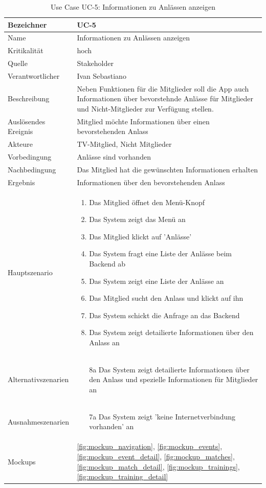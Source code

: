 \begin{table}[ht]
\centering
  \begin{tabular}{ l | p{10cm} }
	\hline
	\rowcolor{gray}
	Bezeichner		&	UC-5\\ \hline
	Name			&	Informationen zu Anlässen anzeigen\\ \hline
	Kritikalität		&	hoch\\ \hline
	Quelle			&	Stakeholder\\ \hline
	Verantwortlicher	&	Ivan Sebastiano\\ \hline
	Beschreibung	&	Neben Funktionen für die Mitglieder soll die App auch Informationen über bevorstehnde Anlässe für Mitglieder und Nicht-Mitglieder zur Verfügung stellen.\\ \hline
	Auslösendes Ereignis&	Mitglied möchte Informationen über einen bevorstehenden Anlass\\ \hline
	Akteure		&	TV-Mitglied, Nicht Mitglieder\\ \hline
	Vorbedingung	&	Anlässe sind vorhanden\\ \hline
	Nachbedingung	&	Das Mitglied hat die gewünschten Informationen erhalten\\ \hline
	Ergebnis		&	Informationen über den bevorstehenden Anlass\\ \hline
	Hauptszenario	&	\begin{enumerate}
					\item Das Mitglied öffnet den Menü-Knopf
					\item Das System zeigt das Menü an
					\item Das Mitglied klickt auf 'Anlässe'
					\item Das System fragt eine Liste der Anlässe beim Backend ab
					\item Das System zeigt eine Liste der Anlässe an
					\item Das Mitglied sucht den Anlass und klickt auf ihn
					\item Das System schickt die Anfrage an das Backend
					\item Das System zeigt detailierte Informationen über den Anlass an
					\end{enumerate}
					\\ \hline
	Alternativszenarien	&	\begin{enumerate}
					\item[8a] Das System zeigt detailierte Informationen über den Anlass und spezielle Informationen für Mitglieder an
					\end{enumerate}
					\\ \hline
	Ausnahmeszenarien&	\begin{enumerate}
					\item[7a] Das System zeigt 'keine Internetverbindung vorhanden' an
					\end{enumerate}
					\\ \hline
	Mockups	 	&	\ref{fig:mockup_navigation}, \ref{fig:mockup_events}, \ref{fig:mockup_event_detail},
					\ref{fig:mockup_matches}, \ref{fig:mockup_match_detail}, \ref{fig:mockup_trainings}, 
					\ref{fig:mockup_training_detail}
  \end{tabular}
   \caption{Use Case UC-5: Informationen zu Anlässen anzeigen}\label{table:use_case_5}
\end{table}


